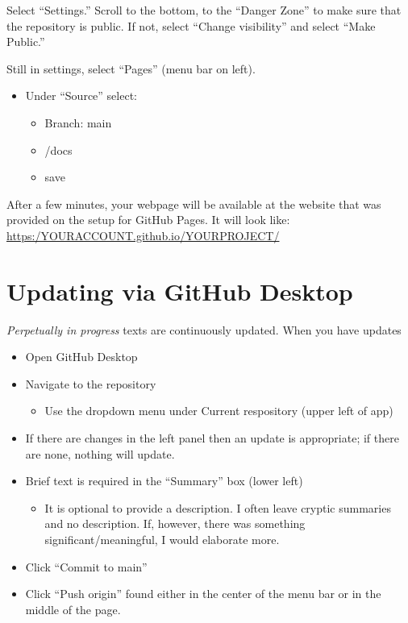 \documentclass[
]{book}
\providecommand{\tightlist}{%
  \setlength{\itemsep}{0pt}\setlength{\parskip}{0pt}}
\begin{document}
Select ``Settings.'' Scroll to the bottom, to the ``Danger Zone'' to make sure that the repository is public. If not, select ``Change visibility'' and select ``Make Public.''

Still in settings, select ``Pages'' (menu bar on left).

\begin{itemize}
\tightlist
\item
  Under ``Source'' select:

  \begin{itemize}
  \tightlist
  \item
    Branch: main
  \item
    /docs
  \item
    save
  \end{itemize}
\end{itemize}

After a few minutes, your webpage will be available at the website that was provided on the setup for GitHub Pages. It will look like: \url{https:/YOURACCOUNT.github.io/YOURPROJECT/}

\hypertarget{updating-via-github-desktop}{%
\section{Updating via GitHub Desktop}\label{updating-via-github-desktop}}

\emph{Perpetually in progress} texts are continuously updated. When you have updates

\begin{itemize}
\tightlist
\item
  Open GitHub Desktop
\item
  Navigate to the repository

  \begin{itemize}
  \tightlist
  \item
    Use the dropdown menu under Current respository (upper left of app)
  \end{itemize}
\item
  If there are changes in the left panel then an update is appropriate; if there are none, nothing will update.
\item
  Brief text is required in the ``Summary'' box (lower left)

  \begin{itemize}
  \tightlist
  \item
    It is optional to provide a description. I often leave cryptic summaries and no description. If, however, there was something significant/meaningful, I would elaborate more.
  \end{itemize}
\item
  Click ``Commit to main''
\item
  Click ``Push origin'' found either in the center of the menu bar or in the middle of the page.
\end{itemize}
\end{document}
